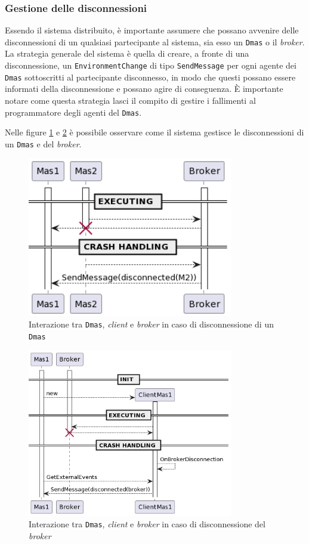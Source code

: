 \subsubsection{Gestione delle disconnessioni}
Essendo il sistema distribuito, è importante assumere che possano avvenire delle disconnessioni di un qualsiasi partecipante al sistema, sia esso un \texttt{Dmas} o il \textit{broker}.
La strategia generale del sistema è quella di creare, a fronte di una disconnessione, un \texttt{EnvironmentChange} di tipo \texttt{SendMessage} per ogni agente dei \texttt{Dmas} sottoscritti al
partecipante disconnesso, in modo che questi possano essere informati della disconnessione e possano agire di conseguenza. È importante notare come questa strategia lasci il compito
di gestire i fallimenti al programmatore degli agenti del \texttt{Dmas}.

Nelle figure \ref{fig:interaction-disconnect} e \ref{fig:interaction-disconnect-broker} è possibile osservare come il sistema gestisce le disconnessioni di un \texttt{Dmas} e del \textit{broker}.

\begin{figure}[ht!]
    \centering
    \includegraphics[width=0.8\textwidth]{figures/sequence-client-crash.png}
    \caption{Interazione tra \texttt{Dmas}, \textit{client} e \textit{broker} in caso di disconnessione di un \texttt{Dmas}}
    \label{fig:interaction-disconnect}
\end{figure}

\begin{figure}[ht!]
    \centering
    \includegraphics[width=0.8\textwidth]{figures/sequence-broker-crash.png}
    \caption{Interazione tra \texttt{Dmas}, \textit{client} e \textit{broker} in caso di disconnessione del \textit{broker}}
    \label{fig:interaction-disconnect-broker}
\end{figure}